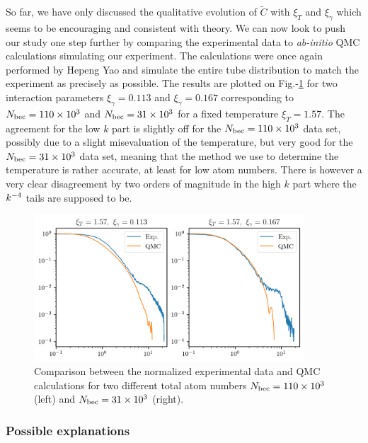 So far, we have only discussed the qualitative evolution of $\tilde{C}$ with $\xi_T$ and $\xi_{\gamma}$ which seems to be encouraging and consistent with theory. We can now look to push our study one step further by comparing the experimental data to {\it ab-initio} QMC calculations simulating our experiment. The calculations were once again performed by Hepeng Yao and simulate the entire tube distribution to match the experiment as precisely as possible. The results are plotted on Fig.-\ref{fig:1D_QMC_comparison} for two interaction parameters $\xi_{\gamma}=0.113$ and $\xi_{\gamma}=0.167$ corresponding to $\NBEC=110 \times 10^3$ and $\NBEC=31 \times 10^3$ for a fixed temperature $\xi_T=1.57$. The agreement for the low $k$ part is slightly off for the $\NBEC=110 \times 10^3$ data set, possibly due to a slight misevaluation of the temperature, but very good for the $\NBEC=31 \times 10^3$ data set, meaning that the method we use to determine the temperature is rather accurate, at least for low atom numbers. There is however a very clear disagreement by two orders of magnitude in the high $k$ part where the $k^{-4}$ tails are supposed to be.

\begin{figure}
    \centering
    \includegraphics[width=0.9\textwidth]{Fig/Chapter5/QMC_comparison.png}
    \caption[Comparison between the normalized experimental data and QMC calculations for two different total atom numbers $\NBEC=110 \times 10^3$ and $\NBEC=31 \times 10^3$]{Comparison between the normalized experimental data and QMC calculations for two different total atom numbers $\NBEC=110 \times 10^3$ (left) and $\NBEC=31 \times 10^3$ (right).}
    \label{fig:1D_QMC_comparison}
\end{figure}

\subsubsection{Possible explanations}


